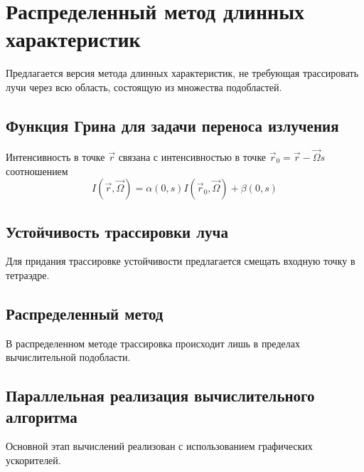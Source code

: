 \chapter{Распределенный метод длинных характеристик}

Предлагается версия метода длинных характеристик, не требующая трассировать лучи через всю область, состоящую из множества подобластей.

\section{Функция Грина для задачи переноса излучения}

Интенсивность в точке $\vec r$ связана с интенсивностью в точке $\vec r_0 = \vec r - \vec \Omega s$ соотношением
\[
I(\vec r, \vec \Omega) = \alpha(0, s) I(\vec r_0, \vec \Omega)  + \beta(0, s)
\]

\section{Устойчивость трассировки луча}

Для придания трассировке устойчивости предлагается смещать входную точку в тетраэдре.

\section{Распределенный метод}

В распределенном методе трассировка происходит лишь в пределах вычислительной подобласти.

\section{Параллельная реализация вычислительного алгоритма}

Основной этап вычислений реализован с использованием графических ускорителей.